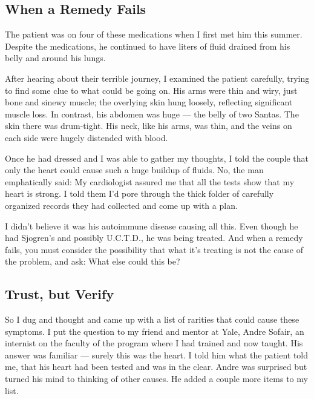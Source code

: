 \hypertarget{when-a-remedy-fails}{%
\subsection{\texorpdfstring{\textbf{When a Remedy
Fails}}{When a Remedy Fails}}\label{when-a-remedy-fails}}

The patient was on four of these medications when I first met him this
summer. Despite the medications, he continued to have liters of fluid
drained from his belly and around his lungs.

After hearing about their terrible journey, I examined the patient
carefully, trying to find some clue to what could be going on. His arms
were thin and wiry, just bone and sinewy muscle; the overlying skin hung
loosely, reflecting significant muscle loss. In contrast, his abdomen
was huge --- the belly of two Santas. The skin there was drum-tight. His
neck, like his arms, was thin, and the veins on each side were hugely
distended with blood.

Once he had dressed and I was able to gather my thoughts, I told the
couple that only the heart could cause such a huge buildup of fluids.
No, the man emphatically said: My cardiologist assured me that all the
tests show that my heart is strong. I told them I'd pore through the
thick folder of carefully organized records they had collected and come
up with a plan.

I didn't believe it was his autoimmune disease causing all this. Even
though he had Sjogren's and possibly U.C.T.D., he was being treated. And
when a remedy fails, you must consider the possibility that what it's
treating is not the cause of the problem, and ask: What else could this
be?

\hypertarget{trust-but-verify}{%
\subsection{\texorpdfstring{\textbf{Trust, but
Verify}}{Trust, but Verify}}\label{trust-but-verify}}

So I dug and thought and came up with a list of rarities that could
cause these symptoms. I put the question to my friend and mentor at
Yale, Andre Sofair, an internist on the faculty of the program where I
had trained and now taught. His answer was familiar --- surely this was
the heart. I told him what the patient told me, that his heart had been
tested and was in the clear. Andre was surprised but turned his mind to
thinking of other causes. He added a couple more items to my list.

